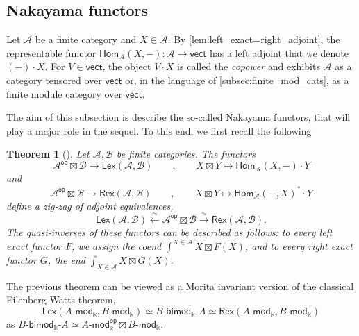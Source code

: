 \documentclass[11pt]{article}
\newtheorem{theorem}{Theorem}[section]
\theoremstyle{definition}
\begin{document}
\subsection{Nakayama functors}

Let $\mathcal{A}$ be a finite category and $X \in \mathcal{A}$. By \cref{lem:left_exact=right_adjoint}, the representable functor  $\mathsf{Hom}_\mathcal{A}(X,-): \mathcal{A} \longrightarrow \mathsf{vect}$  has a left adjoint that we denote $(-) \cdot X$. For $V \in \mathsf{vect}$, the object $V \cdot X$ is called the \emph{copower} and exhibits $\mathcal{A}$ as a category tensored over $\mathsf{vect}$ or, in the language of \cref{subsec:finite_mod_cats}, as a finite module category over $\mathsf{vect}$.


The aim of this subsection is describe the so-called  Nakayama functors, that will play a major role in the sequel. To this end, we first recall the following 

\begin{theorem}[{\cite[Theorem 3.2]{fss}}]\label{thm:fss_zig_zag}
Let $\mathcal{A}, \mathcal{B}$ be finite categories. The functors
$$ \mathcal{A}^\mathsf{op} \boxtimes \mathcal{B} \longrightarrow  \mathsf{Lex}(\mathcal{A},\mathcal{B})  \qquad , \qquad X \boxtimes Y \longmapsto \mathsf{Hom}_\mathcal{A} (X,-) \cdot Y $$
and
$$ \mathcal{A}^\mathsf{op} \boxtimes \mathcal{B} \longrightarrow \mathsf{Rex}(\mathcal{A},\mathcal{B})  \qquad , \qquad X \boxtimes Y \longmapsto \mathsf{Hom}_\mathcal{A} (-,X)^* \cdot Y $$
define a zig-zag of adjoint equivalences,
\begin{equation}\label{eq:fss_zig_zag}
\mathsf{Lex}(\mathcal{A},\mathcal{B}) \overset{\simeq}{\longleftarrow} \mathcal{A}^\mathsf{op} \boxtimes \mathcal{B} \overset{\simeq}{\longrightarrow}  \mathsf{Rex}(\mathcal{A},\mathcal{B}).
\end{equation}
The quasi-inverses of these functors can be described as follows: to every left exact functor $F$, we assign  the coend $\int^{X \in \mathcal{A}} X \boxtimes F(X)$, and to every right exact functor $G$, the end $\int_{X \in \mathcal{A}} X \boxtimes G(X)$.
\end{theorem}

The previous theorem can be viewed as a Morita invariant version of the classical Eilenberg-Watts theorem,
$$  \mathsf{Lex}(A\text{-}\mathsf{mod}_\Bbbk, B\text{-}\mathsf{mod}_\Bbbk) \simeq  B\text{-}\mathsf{bimod}_\Bbbk \text{-} A \simeq \mathsf{Rex}(A\text{-}\mathsf{mod}_\Bbbk, B\text{-}\mathsf{mod}_\Bbbk)  $$ as $B\text{-}\mathsf{bimod}_\Bbbk \text{-} A \simeq  A\text{-}\mathsf{mod}_\Bbbk^\mathsf{op} \boxtimes B\text{-}\mathsf{mod}_\Bbbk$.
\end{document}
